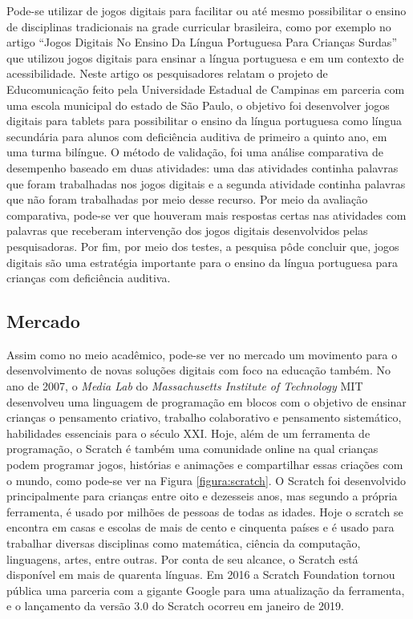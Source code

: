 Pode-se utilizar de jogos digitais para facilitar ou até mesmo possibilitar o ensino de disciplinas tradicionais na grade curricular brasileira, como por exemplo no artigo “Jogos Digitais No Ensino Da Língua Portuguesa Para Crianças Surdas” \cite{liz_2017} que utilizou jogos digitais para ensinar a língua portuguesa e em um contexto de acessibilidade. Neste artigo os pesquisadores relatam o projeto de Educomunicação feito pela Universidade Estadual de Campinas em parceria com uma escola municipal do estado de São Paulo, o objetivo foi desenvolver jogos digitais para tablets para possibilitar o ensino da língua portuguesa como língua secundária para alunos com deficiência auditiva de primeiro a quinto ano, em uma turma bilíngue. O método de validação, foi uma análise comparativa de desempenho baseado em duas atividades: uma das atividades continha palavras que foram trabalhadas nos jogos digitais e a segunda atividade continha palavras que não foram trabalhadas por meio desse recurso. Por meio da avaliação comparativa, pode-se ver que houveram mais respostas certas nas atividades com palavras que receberam intervenção dos jogos digitais desenvolvidos pelas pesquisadoras. Por fim, por meio dos testes, a  pesquisa pôde concluir que, jogos digitais são uma estratégia importante para o ensino da língua portuguesa para crianças com deficiência auditiva.

\subsection{Mercado}
Assim como no meio acadêmico, pode-se ver no mercado um movimento para o desenvolvimento de novas soluções digitais com foco na educação também. 
No ano de 2007, o \textit{Media Lab} do \textit{Massachusetts Institute of Technology} MIT desenvolveu uma linguagem de programação em blocos com o objetivo de ensinar crianças o pensamento criativo, trabalho colaborativo e pensamento sistemático, habilidades essenciais para o século XXI. Hoje, além de um ferramenta de programação, o Scratch é também uma comunidade online na qual crianças podem programar jogos, histórias e animações e compartilhar essas criações com o mundo, como pode-se ver na Figura \ref{figura:scratch}. O Scratch foi desenvolvido principalmente para crianças entre oito e dezesseis anos, mas segundo a própria ferramenta, é usado por milhões de pessoas de todas as idades. Hoje o scratch se encontra em casas e escolas de mais de cento e cinquenta países e é usado para trabalhar diversas disciplinas como matemática, ciência da computação, linguagens, artes, entre outras. Por conta de seu alcance, o Scratch está disponível em mais de quarenta línguas. Em 2016 a Scratch Foundation tornou pública uma parceria com a gigante Google para uma atualização da ferramenta, e o lançamento da versão 3.0 do Scratch ocorreu em janeiro de 2019.

